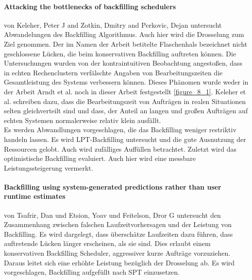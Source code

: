 \paragraph{Attacking the bottlenecks of backfilling schedulers}
von Keleher, Peter J and Zotkin, Dmitry and Perkovic, Dejan \cite{keleher2000attacking} untersucht Abwandelungen des Backfilling Algorithmus. Auch hier wird die Drosselung zum Ziel genommen. Der im Namen der Arbeit betitelte Flaschenhals bezeichnet nicht geschlossene Lücken, die beim konservativen Backfilling auftreten können. Die Untersuchungen wurden von der kontraintuitiven Beobachtung angestoßen, dass in echten Rechenclustern verfälschte Angaben von Bearbeitungszeiten die Gesamtleistung des Systems verbessern können. Dieses Phänomen wurde weder in der Arbeit Arndt et al. \cite{Arn99} noch in dieser Arbeit festgestellt \ref{figure_8_1}. Keleher et al. schreiben dazu, dass die Bearbeitungszeit von Aufträgen in realen Situationen selten gleichverteilt sind und dass, der Anteil an langen und großen Aufträgen auf echten Systemen normalerweise relativ klein ausfällt.\\
Es werden Abwandlungen vorgeschlagen, die das Backfilling weniger restriktiv handeln lassen. Es wird LPT-Backfilling untersucht und die gute Ausnutzung der Ressourcen gelobt. Auch wird zufälliges Auffüllen betrachtet. Zuletzt wird das optimistische Backfilling evaluiert. Auch hier wird eine messbare Leistungssteigerung vermerkt.

\paragraph{Backfilling using system-generated predictions rather than user runtime estimates} von Tsafrir, Dan und Etsion, Yoav und Feitelson, Dror G untersucht den Zusammenhang zwischen falschen Laufzeitvorhersagen und der Leistung von Backfilling.
Es wird dargelegt, dass überschätze Laufzeiten dazu führen, dass auftretende Lücken länger erscheinen, als sie sind. Dies erlaubt einem konservativen Backfilling Scheduler, aggressiver kurze Aufträge vorzuziehen. Daraus leitet sich eine erhöhte Leistung bezüglich der Drosselung ab. Es wird vorgeschlagen, Backfilling aufgefüllt nach SPT einzusetzen. 

\cite{tsafrir2007backfilling}